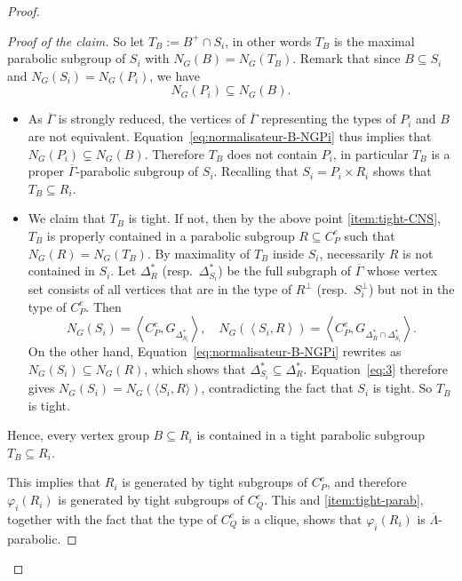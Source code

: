 \documentclass[a4paper,english,11pt]{article}
\theoremstyle{definition}
\theoremstyle{remark}
\begin{document}
\begin{proof}
\begin{proof}[Proof of the claim]
So let $T_B:=B^+\cap S_i$, in other words $T_B$ is the maximal parabolic subgroup of $S_i$ with $N_G(B)=N_G(T_B)$. Remark that since $B\subseteq S_i$ and $N_G(S_i)=N_G(P_i)$, we have 
\begin{equation}
    \label{eq:normalisateur-B-NGPi}
    N_G(P_i)\subseteq N_G(B).
\end{equation}
\begin{itemize}
    \item As $\overline{\Gamma}$ is strongly reduced, the vertices of $\overline{\Gamma}$ representing the types of $P_i$ and $B$ are not equivalent. Equation~\eqref{eq:normalisateur-B-NGPi} thus implies that $N_G(P_i)\subsetneq N_G(B)$.
    Therefore $T_B$ does not contain $P_i$, in particular $T_B$ is a proper $\overline{\Gamma}$-parabolic subgroup of $S_i$.
    Recalling that $S_i=P_i\times R_i$ shows that $T_B\subseteq R_i$. 
    \item We claim that $T_B$ is tight. If not, then by the above point \ref{item:tight-CNS}, $T_B$ is properly contained in a parabolic subgroup $R\subseteq C_P^e$ such that $N_G(R)=N_G(T_B)$. By maximality of $T_B$ inside $S_i$, necessarily $R$ is not contained in $S_i$. Let $\Delta_R^*$ (resp.\ $\Delta_{S_i}^*$) be the full subgraph of $\overline{\Gamma}$ whose vertex set consists of all vertices that are in the type of $R^\perp$ (resp.\ $S_i^\perp$) but not in the type of $C_P^e$. Then 
\begin{equation}\label{eq:3}
    N_G(S_i)=\left\langle { C_P^e, G_{\Delta_{S_i}^*} }\right\rangle, 
    \quad N_G\left( \left\langle{S_i,R}\right\rangle \right)=\left\langle {C_P^e, G_{\Delta_R^*\cap \Delta_{S_i}^*} } \right\rangle.
\end{equation}
On the other hand, Equation~\eqref{eq:normalisateur-B-NGPi} rewrites as $N_G(S_i)\subseteq N_G(R)$, which shows that $\Delta_{S_i}^*\subseteq \Delta_R^*$. Equation~\eqref{eq:3} therefore gives $N_G(S_i)=N_G(\langle S_i,R\rangle)$, contradicting the fact that $S_i$ is tight. So $T_B$ is tight.
\end{itemize}
Hence, every vertex group $B\subseteq R_i$ is contained in a tight parabolic subgroup $T_B\subseteq R_i$. 

This implies that $R_i$ is generated by tight subgroups of $C_P^e$, and therefore $\varphi_i(R_i)$ is generated by tight subgroups of $C_Q^e$. This and \ref{item:tight-parab}, together with the fact that the type of $C_Q^e$ is a clique, shows that $\varphi_i(R_i)$ is $\overline{\Lambda}$-parabolic.
\end{proof}


\end{proof}
\end{document}
